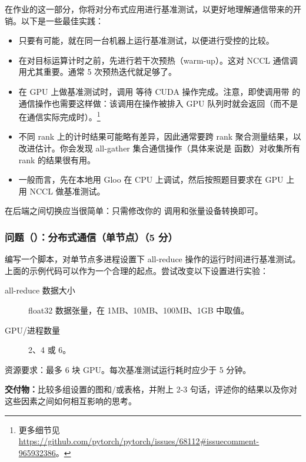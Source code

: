 在作业的这一部分，你将对分布式应用进行基准测试，以更好地理解通信带来的开销。以下是一些最佳实践：

\begin{itemize}
  \item 只要有可能，就在同一台机器上运行基准测试，以便进行受控的比较。
  \item 在对目标运算计时之前，先进行若干次预热（warm-up）。这对 NCCL 通信调用尤其重要。通常 5 次预热迭代就足够了。
  \item 在 GPU 上做基准测试时，调用  等待 CUDA 操作完成。注意，即使调用带  的通信操作也需要这样做：该调用在操作被排入 GPU 队列时就会返回（而不是在通信实际完成时）。\footnote{更多细节见 \url{https://github.com/pytorch/pytorch/issues/68112\#issuecomment-965932386}。}
  \item 不同 rank 上的计时结果可能略有差异，因此通常要跨 rank 聚合测量结果，以改进估计。你会发现 all-gather 集合通信操作（具体来说是  函数）对收集所有 rank 的结果很有用。
  \item 一般而言，先在本地用 Gloo 在 CPU 上调试，然后按照题目要求在 GPU 上用 NCCL 做基准测试。
\end{itemize}

在后端之间切换应当很简单：只需修改你的  调用和张量设备转换即可。

\subsubsection*{问题（）：分布式通信（单节点）（5 分）}

编写一个脚本，对单节点多进程设置下 all-reduce 操作的运行时间进行基准测试。上面的示例代码可以作为一个合理的起点。尝试改变以下设置进行实验：

\begin{description}
  \item[all-reduce 数据大小] float32 数据张量，在 1MB、10MB、100MB、1GB 中取值。
  \item[GPU/进程数量] 2、4 或 6。
\end{description}

资源要求：最多 6 块 GPU。每次基准测试运行耗时应少于 5 分钟。

\textbf{交付物：}比较多组设置的图和/或表格，并附上 2-3 句话，评述你的结果以及你对这些因素之间如何相互影响的思考。
